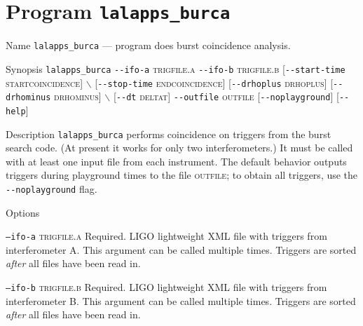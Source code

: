 \clearpage


\section{Program \texttt{lalapps\_burca}}
\label{program:lalapps-burca}

\begin{entry}
\item[Name]
\verb$lalapps_burca$ --- program does burst coincidence analysis.

\item[Synopsis]
\verb$lalapps_burca$ 
\verb$--ifo-a$ \textsc{trigfile.a} \verb$--ifo-b$ \textsc{trigfile.b} 
[\verb$--start-time$ \textsc{startcoincidence}]
$\backslash$ \newline \hspace*{0.25in}
[\verb$--stop-time$ \textsc{endcoincidence}] 
[\verb$--drhoplus$ \textsc{drhoplus}] [\verb$--drhominus$ \textsc{drhominus}] 
$\backslash$ \newline \hspace*{0.25in}
[\verb$--dt$ \textsc{deltat}] 
\verb$--outfile$ \textsc{outfile} [\verb$--noplayground$] 
[\verb$--help$]

\item[Description] 
\verb$lalapps_burca$ performs coincidence on triggers from the burst
search code.  (At present it works for only two interferometers.) It
must be called with at least one input file from each instrument. The
default behavior outputs triggers during playground times to the file
\textsc{outfile};  to obtain all triggers,  use the
\verb$--noplayground$ flag.     

\item[Options]\leavevmode
\begin{entry}
\item[\texttt{--ifo-a} \textsc{trigfile.a}] Required.  LIGO lightweight
XML file with triggers from interferometer A.  This argument can be
called multiple times.  Triggers are sorted \emph{after} all files
have been read in. 

\item[\texttt{--ifo-b} \textsc{trigfile.b}] Required.  LIGO lightweight
XML file with triggers from interferometer B.  This argument can be
called multiple times.  Triggers are sorted \emph{after} all files
have been read in. 


\end{entry}
\end{entry}
